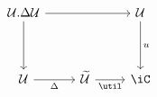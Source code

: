 \[\begin{tikzcd}
	{\Ty.\Delta\Ty} && \Ty \\
	\\
	\Ty & \Tm & \iC
	\arrow["\Delta"', from=3-1, to=3-2]
	\arrow["\util"', from=3-2, to=3-3]
	\arrow["u", from=1-3, to=3-3]
	\arrow[from=1-1, to=3-1]
	\arrow[from=1-1, to=1-3]
\end{tikzcd}\]
